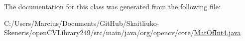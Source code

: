 The documentation for this class was generated from the following file\+:\begin{DoxyCompactItemize}
\item 
C\+:/\+Users/\+Marcius/\+Documents/\+Git\+Hub/\+Skaitliuko-\/\+Skeneris/open\+C\+V\+Library249/src/main/java/org/opencv/core/\mbox{\hyperlink{_mat_of_int4_8java}{Mat\+Of\+Int4.\+java}}\end{DoxyCompactItemize}
